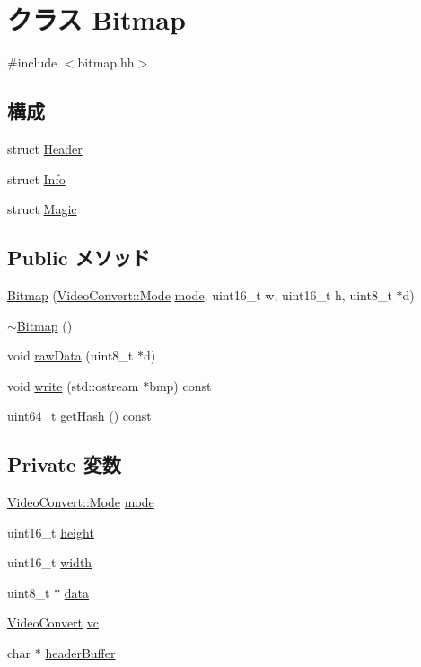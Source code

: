 \hypertarget{classBitmap}{
\section{クラス Bitmap}
\label{classBitmap}
}


{\ttfamily \#include $<$bitmap.hh$>$}\subsection*{構成}
\begin{DoxyCompactItemize}
\item 
struct \hyperlink{structBitmap_1_1Header}{Header}
\item 
struct \hyperlink{structBitmap_1_1Info}{Info}
\item 
struct \hyperlink{structBitmap_1_1Magic}{Magic}
\end{DoxyCompactItemize}
\subsection*{Public メソッド}
\begin{DoxyCompactItemize}
\item 
\hyperlink{classBitmap_a9ff596a4368fb81b7df59656b9090f99}{Bitmap} (\hyperlink{classVideoConvert_a46c8a310cf4c094f8c80e1cb8dc1f911}{VideoConvert::Mode} \hyperlink{classBitmap_a04dbb1673fce676e164d63b34f561279}{mode}, uint16\_\-t w, uint16\_\-t h, uint8\_\-t $\ast$d)
\item 
\hyperlink{classBitmap_a674e993ff780ec078ec387614ba2a230}{$\sim$Bitmap} ()
\item 
void \hyperlink{classBitmap_a22136d203fcf8657490b1844688596c4}{rawData} (uint8\_\-t $\ast$d)
\item 
void \hyperlink{classBitmap_a45a62e70b01ae32e2815ab26cc8219f5}{write} (std::ostream $\ast$bmp) const 
\item 
uint64\_\-t \hyperlink{classBitmap_a3ef96fae93207d460641b50add069399}{getHash} () const 
\end{DoxyCompactItemize}
\subsection*{Private 変数}
\begin{DoxyCompactItemize}
\item 
\hyperlink{classVideoConvert_a46c8a310cf4c094f8c80e1cb8dc1f911}{VideoConvert::Mode} \hyperlink{classBitmap_a04dbb1673fce676e164d63b34f561279}{mode}
\item 
uint16\_\-t \hyperlink{classBitmap_a81c9f8d0b8c3b49d770be14dbe9f0d37}{height}
\item 
uint16\_\-t \hyperlink{classBitmap_ad0eab1042455a2067c812ab8071d5376}{width}
\item 
uint8\_\-t $\ast$ \hyperlink{classBitmap_abe222f6d3581e7920dcad5306cc906a8}{data}
\item 
\hyperlink{classVideoConvert}{VideoConvert} \hyperlink{classBitmap_ae8e736e4fe6c1de602b7f4ac03d7d7a7}{vc}
\item 
char $\ast$ \hyperlink{classBitmap_a5ae882f02e94df66131138319e712c96}{headerBuffer}
\end{DoxyCompactItemize}
